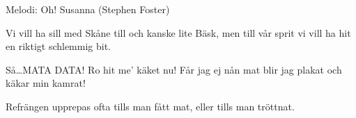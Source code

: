 \begin{song}

\begin{songmeta}
Melodi: Oh! Susanna (Stephen Foster)
\end{songmeta}
\begin{songtext}
Vi vill ha sill med Skåne till
och kanske lite Bäsk,
men till vår sprit
vi vill ha hit
en riktigt schlemmig bit.

Så\ldots MATA DATA!
Ro hit me' käket nu!
Får jag ej nån mat
blir jag plakat
och käkar min kamrat!
\end{songtext}

\begin{songnotes}
Refrängen upprepas ofta tills man fått mat, eller tills man tröttnat.
\end{songnotes}

\end{song}

